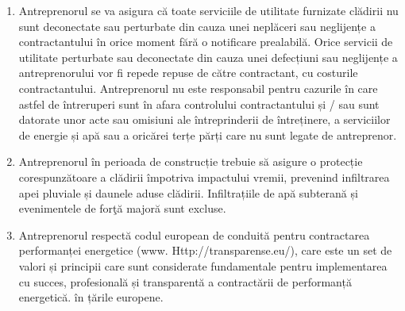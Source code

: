 \begin{multicols}{2}
\begin{enumerate}
\item Antreprenorul se va asigura că toate serviciile de utilitate furnizate clădirii nu sunt deconectate sau perturbate din cauza unei neplăceri sau neglijențe a contractantului în orice moment fără o notificare prealabilă. Orice servicii de utilitate perturbate sau deconectate din cauza unei defecțiuni sau neglijențe a antreprenorului vor fi repede repuse de către contractant, cu costurile contractantului. Antreprenorul nu este responsabil pentru cazurile în care astfel de întreruperi sunt în afara controlului contractantului și / sau sunt datorate unor acte sau omisiuni ale întreprinderii de întreținere, a serviciilor de energie și apă sau a oricărei terțe părți care nu sunt legate de antreprenor.
\item Antreprenorul în perioada de construcție trebuie să asigure o protecție corespunzătoare a clădirii împotriva impactului vremii, prevenind infiltrarea apei pluviale și daunele aduse clădirii. Infiltrațiile de apă subterană și evenimentele de forţă  majoră sunt excluse.
\item Antreprenorul respectă codul european de conduită pentru contractarea performanței energetice (www. Http://transparense.eu/), care este un set de valori și principii care sunt considerate fundamentale pentru implementarea cu succes, profesională și transparentă a contractării de performanță energetică. în țările europene.
\end{enumerate}



\end{multicols}

